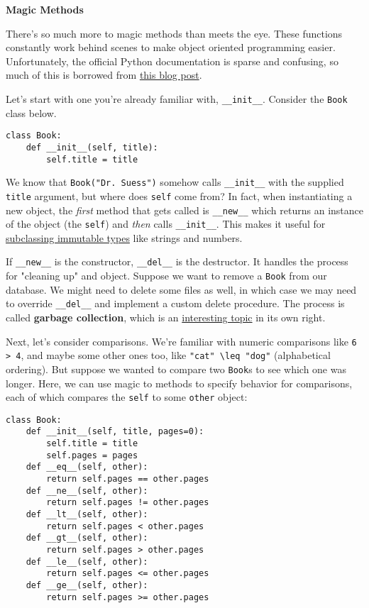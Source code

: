 \textbf{Magic Methods}

There's so much more to magic methods than meets the eye. These functions constantly work behind scenes to make object oriented programming easier. Unfortunately, the official Python documentation is sparse and confusing, so much of this is borrowed from \href{https://rszalski.github.io/magicmethods/}{this blog post}.

Let's start with one you're already familiar with, \lstinline{__init__}. Consider the \lstinline{Book} class below.

\begin{lstlisting}
class Book:
	def __init__(self, title):
		self.title = title
\end{lstlisting}

We know that \lstinline{Book("Dr. Suess")} somehow calls \lstinline{__init__} with the supplied \lstinline{title} argument, but where does \lstinline{self} come from? In fact, when instantiating a new object, the \textit{first} method that gets called is \lstinline{__new__} which returns an instance of the object (the \lstinline{self}) and \textit{then} calls \lstinline{__init__}. This makes it useful for \href{https://www.python.org/download/releases/2.2/descrintro/#__new__}{subclassing immutable types} like strings and numbers. 

If \lstinline{__new__} is the constructor, \lstinline{__del__} is the destructor. It handles the process for "cleaning up" and object. Suppose we want to remove a \lstinline{Book} from our database. We might need to delete some files as well, in which case we may need to override \lstinline{__del__} and implement a custom delete procedure. The process is called \textbf{garbage collection}, which is an \href{https://devguide.python.org/garbage_collector/}{interesting topic} in its own right.

Next, let's consider comparisons. We're familiar with numeric comparisons like \lstinline{6 > 4}, and maybe some other ones too, like \lstinline{"cat" \leq "dog"} (alphabetical ordering). But suppose we wanted to compare two \lstinline{Book}s to see which one was longer. Here, we can use magic to methods to specify behavior for comparisons, each of which compares the \lstinline{self} to some \lstinline{other} object:

\begin{lstlisting}
class Book:
	def __init__(self, title, pages=0):
		self.title = title
		self.pages = pages
	def __eq__(self, other):
		return self.pages == other.pages
	def __ne__(self, other):
		return self.pages != other.pages
	def __lt__(self, other):
		return self.pages < other.pages
	def __gt__(self, other):
		return self.pages > other.pages
	def __le__(self, other):
		return self.pages <= other.pages
	def __ge__(self, other):
		return self.pages >= other.pages
\end{lstlisting}

